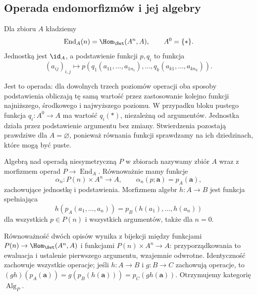 \subsection{Operada endomorfizmów i jej algebry}

\begin{definicja}\label{cat:def:set-endomorphism-operad}
Dla zbioru $A$ kładziemy
\[
 \operatorname{End}_A(n)=\Hom_{\Set}(A^n,A),\qquad A^0=\{*\}.
\]
Jednostką jest $\id_A$, a podstawienie funkcji $p,q_i$ to funkcja
\[
 (a_{ij})_{i,j}\longmapsto
 p(q_1(a_{11},\ldots,a_{1n_1}),\ldots,
   q_k(a_{k1},\ldots,a_{kn_k})).
\]
\end{definicja}
Jest to operada: dla dowolnych trzech poziomów operacji oba sposoby podstawienia obliczają tę samą wartość przez zastosowanie kolejno funkcji najniższego, środkowego i najwyższego poziomu. W przypadku bloku pustego funkcja $q_i:A^0\to A$ ma wartość $q_i(*)$, niezależną od argumentów. Jednostka działa przez podstawienie argumentu bez zmiany. Stwierdzenia pozostają prawdziwe dla $A=\varnothing$, ponieważ równania funkcji sprawdzamy na ich dziedzinach, które mogą być puste.

\begin{definicja}\label{cat:def:operad-algebra}
Algebrą nad operadą niesymetryczną $P$ w zbiorach nazywamy zbiór $A$ wraz z morfizmem operad $P\to\operatorname{End}_A$. Równoważnie mamy funkcje
\[
 \alpha_n:P(n)\times A^n\to A,\qquad
 \alpha_n(p;\mathbf a)=p_A(\mathbf a),
\]
zachowujące jednostkę i podstawienia. Morfizmem algebr $h:A\to B$ jest funkcja spełniająca
\[
 h(p_A(a_1,\ldots,a_n))
 =p_B(h(a_1),\ldots,h(a_n))
\]
dla wszystkich $p\in P(n)$ i wszystkich argumentów, także dla $n=0$.
\end{definicja}
Równoważność dwóch opisów wynika z bijekcji między funkcjami $P(n)\to\Hom_{\Set}(A^n,A)$ i funkcjami $P(n)\times A^n\to A$: przyporządkowania to ewaluacja i ustalenie pierwszego argumentu, wzajemnie odwrotne. Identyczność zachowuje wszystkie operacje; jeśli $h:A\to B$ i $g:B\to C$ zachowują operacje, to $(gh)(p_A(\mathbf a))=g(p_B(h(\mathbf a)))=p_C(gh(\mathbf a))$. Otrzymujemy kategorię $\operatorname{Alg}_P$.

